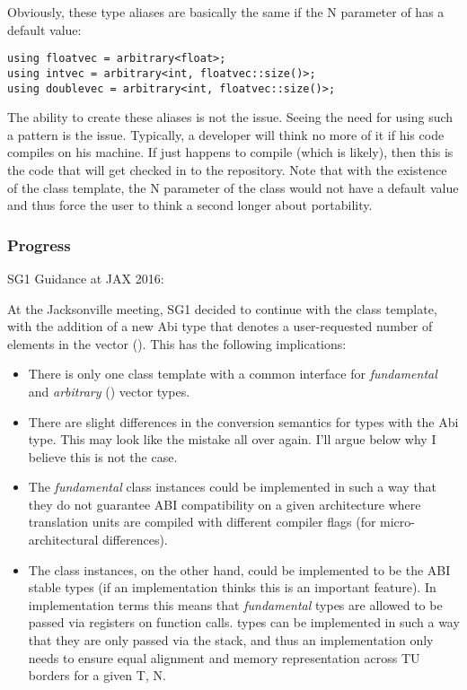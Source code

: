 Obviously, these type aliases are basically the same if the \code N parameter of  has a default value:
\smallskip\begin{lstlisting}[style=Vc]
using floatvec = arbitrary<float>;
using intvec = arbitrary<int, floatvec::size()>;
using doublevec = arbitrary<int, floatvec::size()>;
\end{lstlisting}
The ability to create these aliases is not the issue.
Seeing the need for using such a pattern is the issue.
Typically, a developer will think no more of it if his code compiles on his machine.
If  just happens to compile (which is likely), then this is the code that will get checked in to the repository.
Note that with the existence of the  class template, the \code N parameter of the  class would not have a default value and thus force the user to think a second longer about portability.

\subsubsection{Progress}\label{sec:fixedsize progress}

SG1 Guidance at JAX 2016:\\

At the Jacksonville meeting, SG1 decided to continue with the \simd[<T, Abi>] class template, with the addition of a new Abi type that denotes a user-requested number of elements in the vector (\fixedsizeN).
This has the following implications:
\begin{itemize}
  \item There is only one class template with a common interface for \textit{fundamental} and \textit{arbitrary} (\fixedsize) vector types.
  \item There are slight differences in the conversion semantics for \simd types with the \fixedsize Abi type.
    This may look like the  mistake all over again.
    I'll argue below why I believe this is not the case.
  \item The \textit{fundamental} class instances could be implemented in such a way that they do not guarantee ABI compatibility on a given architecture where translation units are compiled with different compiler flags (for micro-architectural differences).
  \item The \fixedsize class instances, on the other hand, could be implemented to be the ABI stable types (if an implementation thinks this is an important feature).
    In implementation terms this means that \textit{fundamental} types are allowed to be passed via registers on function calls.
    \fixedsize types can be implemented in such a way that they are only passed via the stack, and thus an implementation only needs to ensure equal alignment and memory representation across TU borders for a given \type T, \code N.
\end{itemize}

